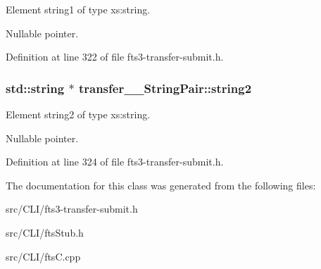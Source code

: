 Element string1 of type xs:string. 

Nullable pointer. 

Definition at line 322 of file fts3-\/transfer-\/submit.h.

\subsubsection[{string2}]{\setlength{\rightskip}{0pt plus 5cm}std::string $\ast$ {\bf transfer\_\-\_\-StringPair::string2}}\label{classtransfer____StringPair_a2aa408d34b32e657c4f5bbdddb862814}


Element string2 of type xs:string. 

Nullable pointer. 

Definition at line 324 of file fts3-\/transfer-\/submit.h.



The documentation for this class was generated from the following files:\begin{DoxyCompactItemize}
\item 
src/CLI/fts3-\/transfer-\/submit.h\item 
src/CLI/ftsStub.h\item 
src/CLI/ftsC.cpp\end{DoxyCompactItemize}

